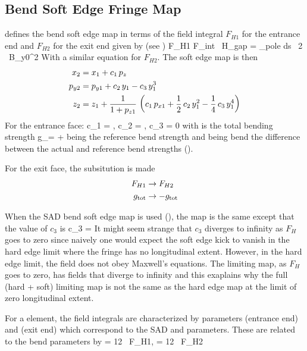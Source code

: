 \subsection{Bend Soft Edge Fringe Map}
\label{s:fringe.bend.soft}

\bmad defines the bend soft edge map in terms of the field integral
$F_{H1}$ for the entrance end and $F_{H2}$ for the exit end given by
(see )
\Begineq
  F_{H1} \equiv F_{int} \, H_{gap} = \int_{pole} \! \! ds \, 
  {2 \, B_{y0}^2}
\Endeq
With a similar equation for $F_{H2}$.
The soft edge map is then
\begin{align}
  x_2 &=  x_1 + c_1 \, p_z \nonumber \\
  p_{y2} &= p_{y1} + c_2 \, y_1 - c_3 \, y_1^3 \\
  z_2 &= z_1 + \frac{1}{1 + p_{z1}} \, \left( 
    c_1 \, p_{x1} + \frac{1}{2} \, c_2 \, y_1^2 -\frac{1}{4} \, c_3 \, y_1^4 \right)
    \nonumber
\end{align}
For the entrance face:
\Begineq
  c_1 = , \qquad 
  c_2 = , \qquad 
  c_3 = 0
\Endeq
with  is the total bending strength
\Begineq
  g_\tot =  + 
\Endeq
{} being the reference bend strength and  being
bend the difference between the actual and reference bend strengths
().

For the exit face, the subsitution is made
\begin{align}
  F_{H1} &\rightarrow F_{H2} \nonumber \\
  g_{\text{tot}} &\rightarrow -g_{\text{tot}}
\end{align}

When the SAD bend soft edge map is used (), the map is
the same except that the value of $c_3$ is
\Begineq
  c_3 = 
\Endeq
It might seem strange that $c_3$ diverges to infinity as $F_H$ goes to
zero since naively one would expect the soft edge kick to vanish in
the hard edge limit where the fringe has no longitudinal
extent. However, in the hard edge limit, the field does not obey
Maxwell's equations. The limiting map, as $F_H$ goes to zero, has
fields that diverge to infinity and this exaplains why the full (hard
+ soft) limiting map is not the same as the hard edge map at the limit
of zero longitudinal extent.

For a  element, the field integrals are characterized by
parameters  (entrance end) and  (exit end) which
correspond to the SAD  and  parameters. These are related
to the bend parameters by
\Begineq
   = 12 \, F_{H1}, \qquad {} = 12 \, F_{H2}
\Endeq

